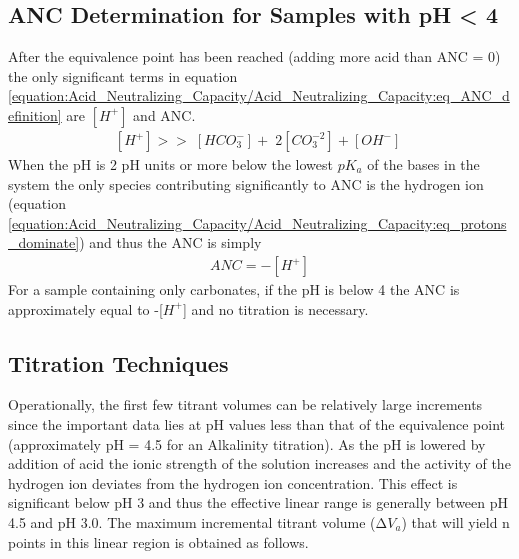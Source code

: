 \documentclass[letterpaper,10pt,english]{sphinxmanual}
\begin{document}
\subsection{ANC Determination for Samples with pH \textless{} 4}
\label{\detokenize{Acid_Neutralizing_Capacity/Acid_Neutralizing_Capacity:anc-determination-for-samples-with-ph-4}}
After the equivalence point has been reached (adding more acid than ANC = 0) the only significant terms in equation \eqref{equation:Acid_Neutralizing_Capacity/Acid_Neutralizing_Capacity:eq_ANC_definition} are \(\left[{H}^{+} \right]\) and ANC.
\begin{equation}\label{equation:Acid_Neutralizing_Capacity/Acid_Neutralizing_Capacity:eq_protons_dominate}
\begin{split}\left[{H}^{+} \right]>>{\; }\left[{HCO}_{{3}}^{{-}} \right]+{\; 2}\left[{CO}_{{3}}^{{-2}} \right]+\left[{OH}^{{-}} \right]{\; }\end{split}
\end{equation}
When the pH is 2 pH units or more below the lowest \(pK_a\) of the bases in the system the only species contributing significantly to ANC is the hydrogen ion (equation \eqref{equation:Acid_Neutralizing_Capacity/Acid_Neutralizing_Capacity:eq_protons_dominate}) and thus the ANC is simply
\begin{equation}\label{equation:Acid_Neutralizing_Capacity/Acid_Neutralizing_Capacity:eq_Gran_pH_lt4}
\begin{split}ANC= - [H^+]\end{split}
\end{equation}
For a sample containing only carbonates, if the pH is below 4 the ANC is approximately equal to -{[}\(H^+\){]} and no titration is necessary.


\subsection{Titration Techniques}
\label{\detokenize{Acid_Neutralizing_Capacity/Acid_Neutralizing_Capacity:titration-techniques}}\label{\detokenize{Acid_Neutralizing_Capacity/Acid_Neutralizing_Capacity:heading-anc-titration-techniques}}
Operationally, the first few titrant volumes can be relatively large increments since the important data lies at pH values less than that of the equivalence point (approximately pH = 4.5 for an Alkalinity titration). As the pH is lowered by addition of acid the ionic strength of the solution increases and the activity of the hydrogen ion deviates from the hydrogen ion concentration. This effect is significant below pH 3 and thus the effective linear range is generally between pH 4.5 and pH 3.0. The maximum incremental titrant volume (\(\mathrm{\Delta}V_a\)) that will yield n points in this linear region is obtained as follows.
\end{document}
